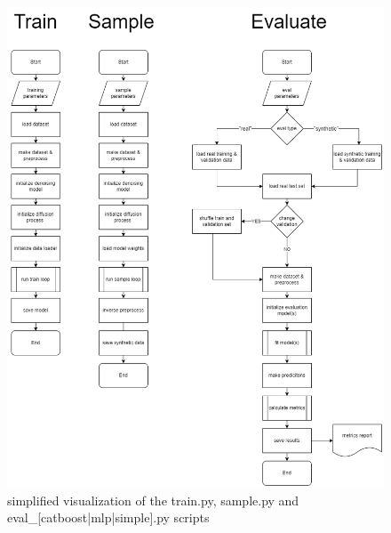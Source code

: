 \begin{figure}
	\centering
	\includegraphics[width=\textwidth]{images/train-sample-eval.png}
	\caption[Train, Sample, Evaluation Script]{simplified visualization of the train.py, sample.py and eval\_[catboost|mlp|simple].py scripts}
	\label{fig:a_original_train_sample_eval}
\end{figure}

